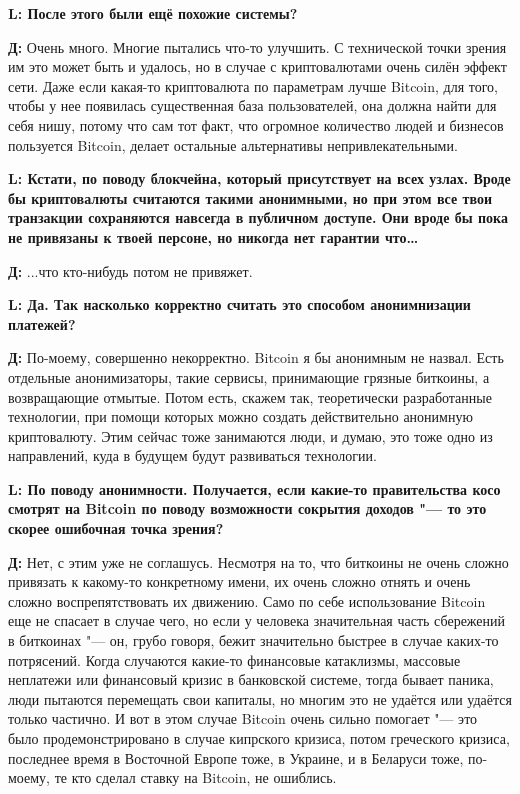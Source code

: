 \documentclass[10pt, a5paper]{article}
\begin{document}
{\noindent \bf L: После этого были ещё похожие системы?}

{\noindent \bf Д:} Очень много. Многие пытались что-то улучшить. С технической точки зрения им это может быть и удалось, но в случае с криптовалютами очень силён эффект сети. Даже если какая-то криптовалюта по параметрам  лучше Bitcoin, для того, чтобы у нее появилась существенная база пользователей, она должна найти для себя нишу, потому что сам тот факт, что огромное количество людей и бизнесов пользуется Bitcoin, делает остальные альтернативы непривлекательными.
 
{\noindent \bf L: Кстати, по поводу блокчейна, который присутствует на всех узлах. Вроде бы криптовалюты считаются такими анонимными, но при этом все твои транзакции сохраняются навсегда в публичном доступе. Они вроде бы пока не привязаны к твоей персоне, но никогда нет гарантии что\ldots}

{\noindent \bf Д:} ...что кто-нибудь потом не привяжет.


{\noindent \bf L: Да. Так насколько корректно считать это способом анонимнизации платежей?}

{\noindent \bf Д:} По-моему, совершенно некорректно. Bitcoin я бы анонимным не назвал. Есть отдельные анонимизаторы, такие сервисы, принимающие грязные биткоины, а возвращающие отмытые. Потом есть, скажем так, теоретически разработанные технологии, при помощи которых можно создать действительно анонимную криптовалюту. Этим сейчас тоже занимаются люди, и думаю, это тоже одно из направлений, куда в будущем будут развиваться технологии.

{\noindent \bf L: По поводу анонимности. Получается, если какие-то правительства косо смотрят на Bitcoin по поводу возможности сокрытия доходов "--- то это скорее ошибочная точка зрения?}

{\noindent \bf Д:} Нет, с этим уже не соглашусь. Несмотря на то, что биткоины не очень сложно привязать к какому-то конкретному имени, их очень сложно отнять и очень сложно воспрепятствовать их движению. Само по себе использование Bitcoin еще не спасает в случае чего, но если у человека значительная часть сбережений в биткоинах "--- он, грубо говоря, бежит значительно быстрее в случае каких-то потрясений. Когда случаются какие-то финансовые катаклизмы, массовые неплатежи или финансовый кризис в банковской системе, тогда бывает паника, люди пытаются перемещать свои капиталы, но многим это не удаётся или удаётся только частично. И вот в этом случае Bitcoin очень сильно помогает "--- это было продемонстрировано в случае кипрского кризиса, потом греческого кризиса, последнее время в Восточной Европе тоже, в Украине, и в Беларуси тоже, по-моему, те кто сделал ставку на Bitcoin, не ошиблись. 
\end{document}
